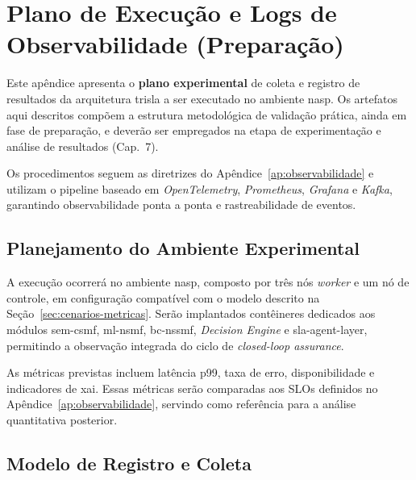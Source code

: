 
\chapter{Plano de Execução e Logs de Observabilidade (Preparação)}
\label{ap:resultados-observabilidade}

Este apêndice apresenta o \textbf{plano experimental} de coleta e registro de resultados da arquitetura \ac{trisla} a ser executado no ambiente \ac{nasp}.  
Os artefatos aqui descritos compõem a estrutura metodológica de validação prática, ainda em fase de preparação, e deverão ser empregados na etapa de experimentação e análise de resultados (Cap.~7).  

Os procedimentos seguem as diretrizes do Apêndice~\ref{ap:observabilidade} e utilizam o pipeline baseado em \textit{OpenTelemetry}, \textit{Prometheus}, \textit{Grafana} e \textit{Kafka}, garantindo observabilidade ponta a ponta e rastreabilidade de eventos.

\section{Planejamento do Ambiente Experimental}
\label{sec:contexto-execucao}

A execução ocorrerá no ambiente \ac{nasp}, composto por três nós \textit{worker} e um nó de controle, em configuração compatível com o modelo descrito na Seção~\ref{sec:cenarios-metricas}.  
Serão implantados contêineres dedicados aos módulos \ac{sem-csmf}, \ac{ml-nsmf}, \ac{bc-nssmf}, \textit{Decision Engine} e \ac{sla-agent-layer}, permitindo a observação integrada do ciclo de \textit{closed-loop assurance}.  

As métricas previstas incluem latência p99, taxa de erro, disponibilidade e indicadores de \ac{xai}.  
Essas métricas serão comparadas aos \acp{SLO} definidos no Apêndice~\ref{ap:observabilidade}, servindo como referência para a análise quantitativa posterior.

\section{Modelo de Registro e Coleta}
\label{sec:coleta-planejada}

